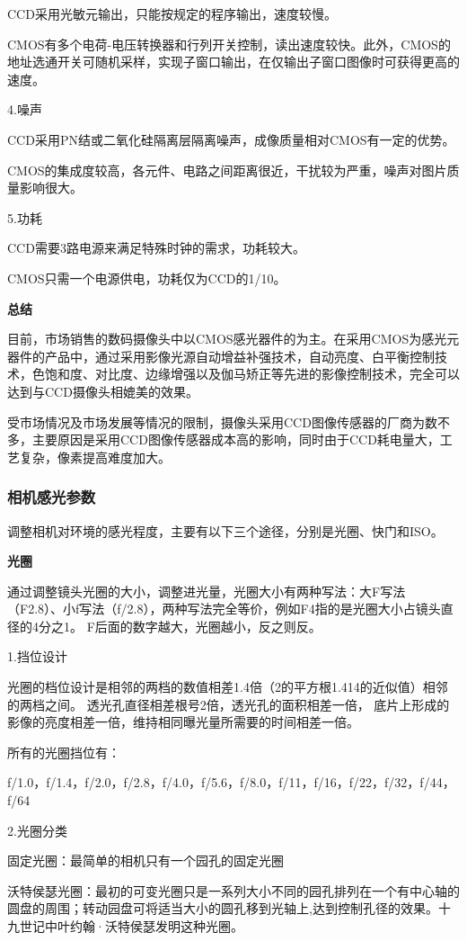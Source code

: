 CCD采用光敏元输出，只能按规定的程序输出，速度较慢。

CMOS有多个电荷-电压转换器和行列开关控制，读出速度较快。此外，CMOS的地址选通开关可随机采样，实现子窗口输出，在仅输出子窗口图像时可获得更高的速度。

4.噪声

CCD采用PN结或二氧化硅隔离层隔离噪声，成像质量相对CMOS有一定的优势。

CMOS的集成度较高，各元件、电路之间距离很近，干扰较为严重，噪声对图片质量影响很大。

5.功耗

CCD需要3路电源来满足特殊时钟的需求，功耗较大。

CMOS只需一个电源供电，功耗仅为CCD的1/10。

\textbf{总结}

目前，市场销售的数码摄像头中以CMOS感光器件的为主。在采用CMOS为感光元器件的产品中，通过采用影像光源自动增益补强技术，自动亮度、白平衡控制技术，色饱和度、对比度、边缘增强以及伽马矫正等先进的影像控制技术，完全可以达到与CCD摄像头相媲美的效果。

受市场情况及市场发展等情况的限制，摄像头采用CCD图像传感器的厂商为数不多，主要原因是采用CCD图像传感器成本高的影响，同时由于CCD耗电量大，工艺复杂，像素提高难度加大。

\subsubsection{相机感光参数}
调整相机对环境的感光程度，主要有以下三个途径，分别是光圈、快门和ISO。

\textbf{光圈}

通过调整镜头光圈的大小，调整进光量，光圈大小有两种写法：大F写法（F2.8）、小f写法（f/2.8），两种写法完全等价，例如F4指的是光圈大小占镜头直径的4分之1。
F后面的数字越大，光圈越小，反之则反。

1.挡位设计

光圈的档位设计是相邻的两档的数值相差1.4倍（2的平方根1.414的近似值）相邻的两档之间。
透光孔直径相差根号2倍，透光孔的面积相差一倍， 底片上形成的影像的亮度相差一倍，维持相同曝光量所需要的时间相差一倍。

所有的光圈挡位有：

f/1.0，f/1.4，f/2.0，f/2.8，f/4.0，f/5.6，f/8.0，f/11，f/16，f/22，f/32，f/44，f/64

2.光圈分类

固定光圈：最简单的相机只有一个园孔的固定光圈

沃特侯瑟光圈：最初的可变光圈只是一系列大小不同的园孔排列在一个有中心轴的圆盘的周围；转动园盘可将适当大小的圆孔移到光轴上,达到控制孔径的效果。十九世记中叶约翰·沃特侯瑟发明这种光圈。

